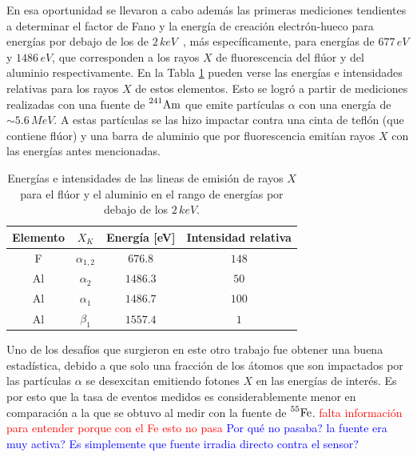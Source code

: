 En esa oportunidad se llevaron a cabo además las primeras mediciones tendientes a determinar el factor de Fano y la energía de creación electrón-hueco para energías por debajo de los de $2\,\si{keV}$~\cite{TesisKevin}, más específicamente, para energías de $677\,\si{eV}$ y $1486\,\si{eV}$, que corresponden a los rayos $X$ de fluorescencia del flúor y del aluminio respectivamente. 
En la Tabla \ref{tab:EnergiasFluorescenciaFAl} pueden verse las energías e intensidades relativas para los rayos $X$ de estos elementos. 
Esto se logró a partir de mediciones realizadas con una fuente de $\prescript{241}{}{\mbox{Am}}$ que emite partículas $\alpha$ con una energía de $\sim 5.6\,\si{MeV}$. 
A estas partículas se las hizo impactar contra una cinta de teflón (que contiene flúor) y una barra de aluminio que por fluorescencia emitían rayos $X$ con las energías antes mencionadas. 
\begin{table}[h]
\centering
\begin{tabular}{@{}cccc@{}}
\toprule
Elemento    &   $X_{K}$         &   Energía [eV]    &   Intensidad relativa \\ \hline \hline
F           &   $\alpha_{1,2}$  &   $676.8$         &   $148$               \\
Al          &   $\alpha_{2}$    &   $1486.3$        &   $50$                \\
Al          &   $\alpha_{1}$    &   $1486.7$        &   $100$               \\
Al          &   $\beta_{1}$     &   $1557.4$        &   $1$                 \\ \bottomrule
\end{tabular}
\caption{Energías e intensidades de las lineas de emisión de rayos $X$ para el flúor y el aluminio en el rango de energías por debajo de los $2\,\si{keV}$.}
\label{tab:EnergiasFluorescenciaFAl}
\end{table}

Uno de los desafíos que surgieron en este otro trabajo fue obtener una buena estadística, debido a %
que solo una fracción de los átomos que son impactados por las partículas $\alpha$ se desexcitan emitiendo fotones $X$ en las energías de interés. Es por esto que la tasa de eventos medidos es considerablemente menor en comparación a la que se obtuvo al medir con la fuente de $\prescript{55}{}{\mbox{Fe}}$.
\textcolor{red}{falta información para entender porque con el Fe esto no pasa} \textcolor{blue}{Por qué no pasaba? la fuente era muy activa? Es simplemente que fuente irradia directo contra el sensor?}

